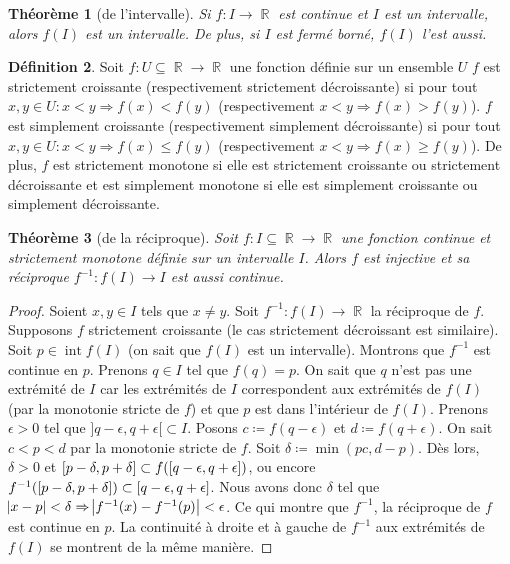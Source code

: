 \documentclass{article}
\DeclareMathOperator{\intr}{int}
\DeclareMathOperator{\R}{\mathbb R}
\newtheorem{thm}{Théorème}[section]
\theoremstyle{definition}
\newtheorem{déf}[thm]{Définition}
\theoremstyle{remark}
\begin{document}
		\begin{thm}[de l'intervalle] Si $f : I \to \R$ est continue et $I$ est un intervalle, alors $f(I)$ est un intervalle. De plus, si $I$ est fermé borné,
		$f(I)$ l'est aussi. \end{thm}

		\begin{déf} Soit $f : U \subseteq \R \to \R$ une fonction définie sur un ensemble $U$ $f$ est strictement croissante (respectivement strictement
		décroissante) si pour tout $x, y \in U : x < y \Rightarrow f(x) < f(y)$ (respectivement $x < y \Rightarrow f(x) > f(y)$). $f$ est simplement croissante
		(respectivement simplement décroissante) si pour tout $x, y \in U : x < y \Rightarrow f(x) \leq f(y)$ (respectivement $x < y \Rightarrow f(x) \geq f(y)$).
		De plus, $f$ est strictement monotone si elle est strictement croissante ou strictement décroissante et est simplement monotone si elle est simplement
		croissante ou simplement décroissante. \end{déf}

		\begin{thm}[de la réciproque] Soit $f : I \subseteq \R \to \R$ une fonction continue et strictement monotone définie sur un intervalle $I$. Alors
		$f$ est injective et sa réciproque $f^{-1} : f(I) \to I$ est aussi continue. \end{thm}

		\begin{proof} Soient $x, y \in I$ tels que $x \neq y$. Soit $f^{-1} : f(I) \to \R$ la réciproque de $f$. Supposons $f$ strictement croissante
		(le cas strictement décroissant est similaire). Soit $p \in \intr f(I)$ (on sait que $f(I)$ est un intervalle). Montrons que $f^{-1}$ est continue en
		$p$. Prenons $q \in I$ tel que $f(q) = p$. On sait que $q$ n'est pas une extrémité de $I$ car les extrémités de $I$ correspondent aux extrémités de
		$f(I)$ (par la monotonie stricte de $f$) et que $p$ est dans l'intérieur de $f(I)$. Prenons $\epsilon > 0$ tel que $]q-\epsilon, q+\epsilon[ \subset I$.
		Posons $c \coloneqq f(q-\epsilon)$ et $d \coloneqq f(q+\epsilon)$. On sait $c < p < d$ par la monotonie stricte de $f$. Soit
		$\delta \coloneqq \min(pc, d-p)$. Dès lors, $\delta > 0$ et $\interval {p-\delta}{p+\delta} \subset f(\interval {q-\epsilon}{q+\epsilon})$, ou encore
		$f^{-1}(\interval {p-\delta}{p+\delta}) \subset \interval {q-\epsilon}{q+\epsilon}$. Nous avons donc $\delta$ tel que
		$\abs{x-p} < \delta \Rightarrow \abs{f^{-1}(x)-f^{-1}(p)} < \epsilon$. Ce qui montre que $f^{-1}$, la réciproque de $f$ est continue en $p$. La continuité
		à droite et à gauche de $f^{-1}$ aux extrémités de $f(I)$ se montrent de la même manière. \end{proof}
	
\end{document}
